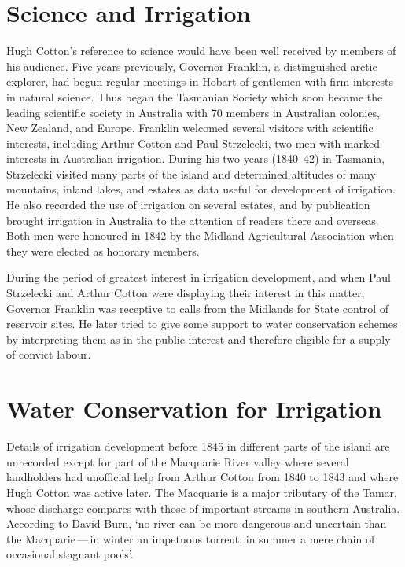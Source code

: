 \section*{Science and Irrigation}

Hugh Cotton's reference to science would have been well received by
members of his audience.  Five years previously, Governor
Franklin, a distinguished arctic explorer,
had begun regular meetings in Hobart of gentlemen with firm interests
in natural science.  Thus began the Tasmanian Society which soon
became the leading scientific society in Australia with 70 members in
Australian colonies, New Zealand, and Europe.  Franklin welcomed
several visitors with scientific interests, including Arthur Cotton
and Paul Strzelecki, two men with marked
interests in Australian irrigation.  During his two years (1840--42)
in Tasmania, Strzelecki visited many parts of the island and
determined altitudes of many mountains, inland lakes, and estates as
data useful for development of irrigation.  He also recorded the use
of irrigation on several estates, and by publication brought
irrigation in Australia to the attention of readers there and
overseas.  Both men were honoured in 1842 by the Midland Agricultural
Association when they were elected as honorary members.

During the period of greatest interest in irrigation development, and
when Paul Strzelecki and Arthur Cotton were displaying their interest
in this matter, Governor Franklin was receptive to calls from the
Midlands for State control of reservoir sites. He later tried to give
some support to water conservation schemes by interpreting them as in
the public interest and therefore eligible for a supply of convict
labour.

\section*{Water Conservation for Irrigation}

Details of irrigation development before 1845 in different parts of
the island are unrecorded except for part of the Macquarie
River valley where several landholders had
unofficial help from Arthur Cotton from 1840 to 1843 and where Hugh
Cotton was active later.  The Macquarie is a major tributary of the
Tamar, whose discharge compares with those of
important streams in southern Australia. According to David Burn, `no
river can be more dangerous and uncertain than the Macquarie\,---\,in
winter an impetuous torrent; in summer a mere chain of occasional
stagnant pools'.

